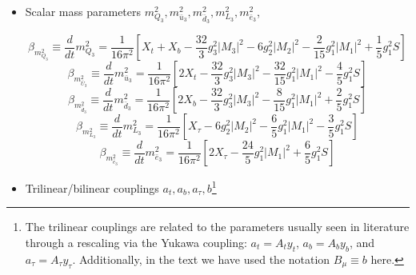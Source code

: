 \begin{itemize}
\item Scalar mass parameters $m^2_{Q_3},m^2_{\bar{u}_3},m^2_{\bar{d}_3},m^2_{L_3},m^2_{\bar{e}_3}$,

\begin{fleqn}
\begin{equation}
\beta_{m^2_{Q_3}} \equiv \frac{d}{dt}m^2_{Q_3}=\frac{1}{16\pi^2}\left[X_t+X_b-\frac{32}{3}g^2_3|M_3|^2-6g_2^2|M_2|^2-\frac{2}{15}g^2_1|M_1|^2+\frac{1}{5}g^2_1S\right]
\end{equation}
\begin{equation}
\beta_{m^2_{\bar{U}_3}} \equiv \frac{d}{dt}m^2_{\bar{u}_3}=\frac{1}{16\pi^2}\left[2X_t-\frac{32}{3}g^2_3|M_3|^2-\frac{32}{15}g^2_1|M_1|^2-\frac{4}{5}g^2_1S\right]
\end{equation}
\begin{equation}
\beta_{m^2_{\bar{d}_3}} \equiv \frac{d}{dt}m^2_{\bar{d}_3}=\frac{1}{16\pi^2}\left[2X_b-\frac{32}{3}g^2_3|M_3|^2-\frac{8}{15}g^2_1|M_1|^2+\frac{2}{5}g^2_1S\right]
\end{equation}
\begin{equation}
\beta_{m^2_{L_3}} \equiv \frac{d}{dt}m^2_{L_3}=\frac{1}{16\pi^2}\left[X_{\tau}-6g^2_2|M_2|^2-\frac{6}{5}g^2_1|M_1|^2-\frac{3}{5}g^2_1S\right]
\end{equation}
\begin{equation}
\beta_{m^2_{\bar{e}_3}} \equiv \frac{d}{dt}m^2_{\bar{e}_3}=\frac{1}{16\pi^2}\left[2X_{\tau}-\frac{24}{5}g^2_1|M_1|^2+\frac{6}{5}g^2_1S\right]
\end{equation}
\end{fleqn}

\item Trilinear/bilinear couplings $a_t,a_b,a_{\tau},b$\footnote{The trilinear couplings are related to the parameters usually seen in literature through a rescaling via the Yukawa coupling: $a_t=A_t y_t$, $a_b=A_b y_b$, and $a_{\tau}=A_{\tau} y_{\tau}$. Additionally, in the text we have used the notation $B_{\mu} \equiv b$ here.}


\end{itemize}
